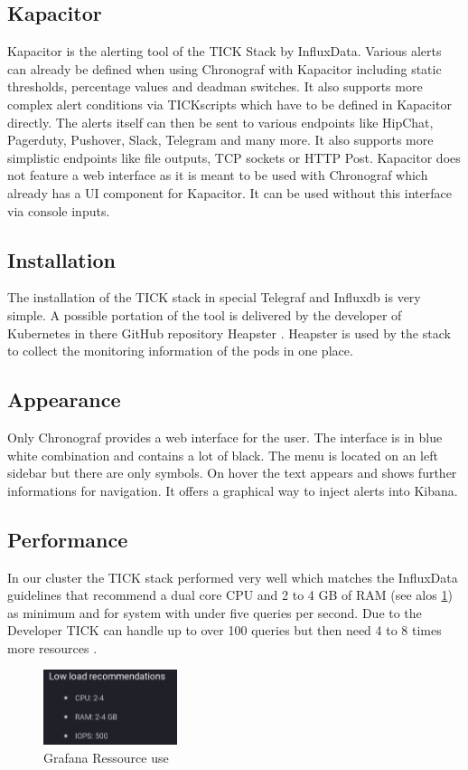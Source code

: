 \subsection{Kapacitor}
Kapacitor is the alerting tool of the TICK Stack by InfluxData. Various alerts can already be defined when using Chronograf with Kapacitor including static thresholds, percentage values and deadman switches. It also supports more complex alert conditions via TICKscripts which have to be defined in Kapacitor directly.
The alerts itself can then be sent to various endpoints like HipChat, Pagerduty, Pushover, Slack, Telegram and many more. It also supports more simplistic endpoints like file outputs, TCP sockets or HTTP Post.
Kapacitor does not feature a web interface as it is meant to be used with Chronograf which already has a UI component for Kapacitor. It can be used without this interface via console inputs.
\subsection{Installation}
The installation of the TICK stack in special Telegraf and Influxdb is very simple. A possible portation of the tool is delivered by the developer of Kubernetes in there GitHub repository Heapster \cite{heapster}. Heapster is used by the stack to collect the monitoring information of the pods in one place.
\subsection{Appearance}
Only Chronograf provides a web interface for the user. The interface is in blue white combination and contains a lot of black. The menu is located on an left sidebar but there are only symbols. On hover the text appears and shows further informations for navigation. It offers a graphical way to inject alerts into Kibana.

\subsection{Performance}
In our cluster the TICK stack performed very well which matches the InfluxData guidelines that recommend a dual core CPU and 2 to 4 GB of RAM (see alos \cref{fig:TICK_recommendet}) as minimum and for system with under five queries per second. Due to the Developer TICK can handle up to over 100 queries but then need 4 to 8 times more resources \cite{influx_require}.
\begin{figure}
\centering
\includegraphics[width=0.35\textwidth]{Bilder/Performance/TICK_recommendet}
\caption{Grafana Ressource use}
\label{fig:TICK_recommendet}
\end{figure}

